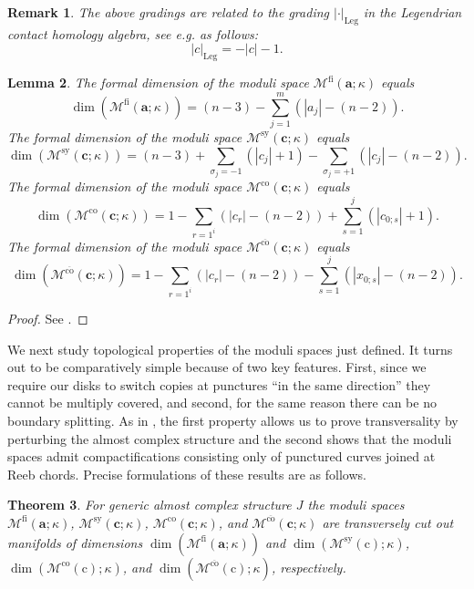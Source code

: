 \documentclass{gtpart}
\newtheorem{thm}{Theorem}
\newtheorem{lem}[thm]{Lemma}
\newtheorem{rem}[thm]{Remark}
\renewcommand{\co}{\mathrm{co}}
\newcommand{\fl}{\mathrm{fi}}
\newcommand{\sy}{\mathrm{sy}}
\begin{document}
\begin{rem}
The above gradings are related to the grading $|\cdot|_{\mathrm{Leg}}$ in the Legendrian contact homology algebra, see e.g. \cite{EESPxR,BEE} as follows: 
\[ 
|c|_{\mathrm{Leg}}=-|c|-1.
\]
\end{rem} 
 
\begin{lem}
The formal dimension of the moduli space $\mathcal{M}^{\fl}(\mathbf{a};\kappa)$ equals
\[ 
\dim\left(\mathcal{M}^{\fl}(\mathbf{a};\kappa)\right)=
(n-3) - \sum_{j=1}^{m}(|a_{j}|-(n-2)).
\]
The formal dimension of the moduli space $\mathcal{M}^{\sy}(\mathbf{c};\kappa)$ equals
\[ 
\dim\left(\mathcal{M}^{\sy}(\mathbf{c};\kappa)\right)=
(n-3) + \sum_{\sigma_{j}=-1} (|c_{j}|+1) - \sum_{\sigma_{j}=+1}(|c_{j}|-(n-2)).
\]
The formal dimension of the moduli space $\mathcal{M}^{\co}(\mathbf{c};\kappa)$ equals
\[ 
\dim\left(\mathcal{M}^{\co}(\mathbf{c};\kappa)\right)=
1 - \sum_{r=1^{i}}(|c_{r}|-(n-2)) + \sum_{s=1}^{j} (|c_{0;s}|+1).
\]
The formal dimension of the moduli space $\mathcal{M}^{\overline{\co}}(\mathbf{c};\kappa)$ equals
\[ 
\dim\left(\mathcal{M}^{\overline{\co}}(\mathbf{c};\kappa)\right)=
1 - \sum_{r=1^{i}}(|c_{r}|-(n-2)) - \sum_{s=1}^{j} (|x_{0;s}|-(n-2)).
\]
\end{lem}

\begin{proof}
See \cite[Theorem A.1]{CEL}.
\end{proof}


We next study topological properties of the moduli spaces just defined. It turns out to be comparatively simple because of two key features. First, since we require our disks to switch copies at punctures ``in the same direction'' they cannot be multiply covered, and second, for the same reason there can be no boundary splitting. As in \cite{Ersft}, the first property allows us to prove transversality by perturbing the almost complex structure and the second shows that the moduli spaces admit compactifications consisting only of punctured curves joined at Reeb chords. Precise formulations of these results are as follows. 

\begin{thm}\label{thm:mdlitv}
For generic almost complex structure $J$ the moduli spaces $\mathcal{M}^{\fl}(\mathbf{a};\kappa)$, $\mathcal{M}^{\sy}(\mathbf{c};\kappa)$, $\mathcal{M}^{\co}(\mathbf{c};\kappa)$, and $\mathcal{M}^{\overline{\co}}(\mathbf{c};\kappa)$ are transversely cut out manifolds of dimensions $\dim(\mathcal{M}^{\fl}(\mathbf{a};\kappa))$ and $\dim(\mathcal{M}^{\sy}(\mathrm{c});\kappa)$, $\dim(\mathcal{M}^{\co}(\mathrm{c});\kappa)$, and $\dim(\mathcal{M}^{\overline{\co}}(\mathrm{c});\kappa)$, respectively. 
\end{thm}  
\end{document}
